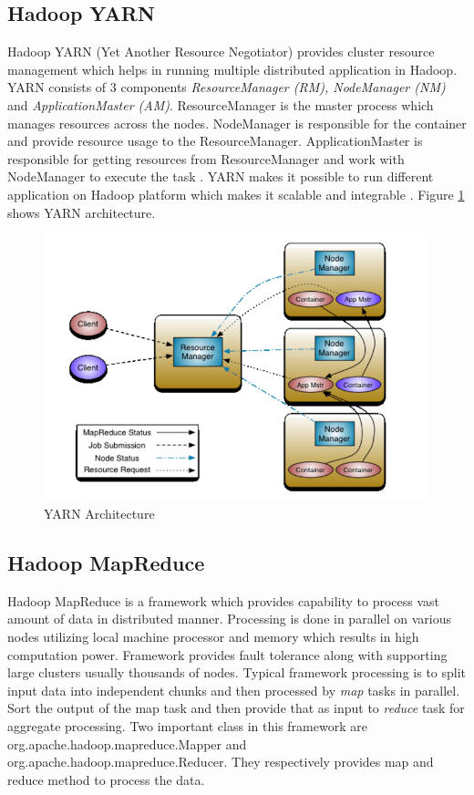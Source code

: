 \documentclass[sigconf]{acmart}
\begin{document}
\subsection{Hadoop YARN}
Hadoop YARN (Yet Another Resource Negotiator) provides cluster resource management which helps in running multiple distributed application in Hadoop. YARN consists of 3 components \emph{ResourceManager (RM), NodeManager (NM)} and \emph{ApplicationMaster (AM)}. ResourceManager is the master process which manages resources across the nodes. NodeManager is responsible for the container and provide resource usage to the ResourceManager. ApplicationMaster is responsible for getting resources from ResourceManager and work with NodeManager to execute the task \cite{www-apache-yarn}. YARN makes it possible to run different application on Hadoop platform which makes it scalable and integrable \cite[Ch.\ 3, p. 65]{AchariShiva2015HE}.
Figure \ref{f:yarn-arch} shows YARN architecture.
\begin{figure}[!ht]
  \centering\includegraphics[width=\columnwidth]{images/yarnArch.PNG}
  \caption{YARN Architecture \cite{www-apache-yarn}}\label{f:yarn-arch}
\end{figure}

\subsection{Hadoop MapReduce}
Hadoop MapReduce is a framework which provides capability to process vast amount of data in distributed manner. Processing is done in parallel on various nodes utilizing local machine processor and memory which results in high computation power. Framework provides fault tolerance along with supporting large clusters usually thousands of nodes. Typical framework processing is to split input data into independent chunks and then processed by \emph{map} tasks in parallel. Sort the output of the map task and then provide that as input to \emph{reduce} task for aggregate processing. Two important class in this framework are org.apache.hadoop.mapreduce.Mapper and org.apache.hadoop.mapreduce.Reducer. They respectively provides map and reduce method to process the data. 
\end{document}
